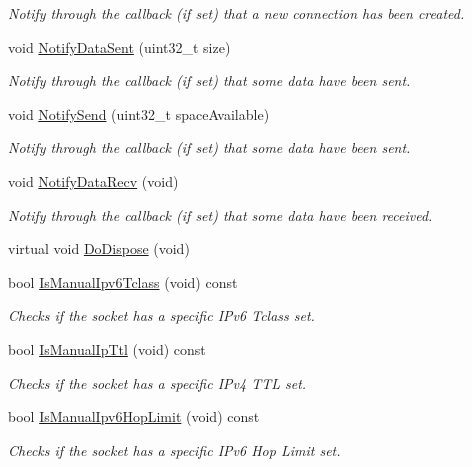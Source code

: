 \begin{DoxyCompactItemize}
\begin{DoxyCompactList}\small\item\em Notify through the callback (if set) that a new connection has been created. \end{DoxyCompactList}\item 
void \hyperlink{classns3_1_1Socket_ae478fc503f7041a1da5e9db361f1ae20}{Notify\+Data\+Sent} (uint32\+\_\+t size)
\begin{DoxyCompactList}\small\item\em Notify through the callback (if set) that some data have been sent. \end{DoxyCompactList}\item 
void \hyperlink{classns3_1_1Socket_a34cd5de5b9feeadd6ba8973b954c3d5f}{Notify\+Send} (uint32\+\_\+t space\+Available)
\begin{DoxyCompactList}\small\item\em Notify through the callback (if set) that some data have been sent. \end{DoxyCompactList}\item 
void \hyperlink{classns3_1_1Socket_a91fa3046bbd0a7644381f1d2481bdfef}{Notify\+Data\+Recv} (void)
\begin{DoxyCompactList}\small\item\em Notify through the callback (if set) that some data have been received. \end{DoxyCompactList}\item 
virtual void \hyperlink{classns3_1_1Socket_a5498f836b9b551dd7069562d05382e83}{Do\+Dispose} (void)
\item 
bool \hyperlink{classns3_1_1Socket_a83858f6116bcdabecf1b63b37514ec8d}{Is\+Manual\+Ipv6\+Tclass} (void) const 
\begin{DoxyCompactList}\small\item\em Checks if the socket has a specific I\+Pv6 Tclass set. \end{DoxyCompactList}\item 
bool \hyperlink{classns3_1_1Socket_afbbd0ecd7cda631cafc80eda33aa0b2c}{Is\+Manual\+Ip\+Ttl} (void) const 
\begin{DoxyCompactList}\small\item\em Checks if the socket has a specific I\+Pv4 T\+TL set. \end{DoxyCompactList}\item 
bool \hyperlink{classns3_1_1Socket_af537e44bad2f67bffe7ef6c1c86c2459}{Is\+Manual\+Ipv6\+Hop\+Limit} (void) const 
\begin{DoxyCompactList}\small\item\em Checks if the socket has a specific I\+Pv6 Hop Limit set. \end{DoxyCompactList}\end{DoxyCompactItemize}
